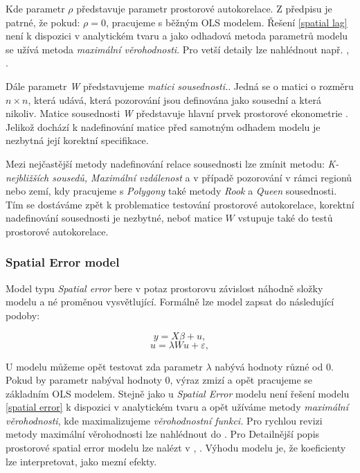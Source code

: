 \documentclass[11pt, a4paper]{article}
\begin{document}
Kde parametr \textit{$\rho$} představuje parametr prostorové autokorelace. Z předpisu je patrné, že pokud: \textit{$\rho = 0$}, pracujeme s běžným OLS modelem. Řešení \ref{spatial lag} není k dispozici v analytickém tvaru a jako odhadová metoda parametrů modelu se užívá metoda \textit{maximální věrohodnosti}. Pro vetší detaily lze nahlédnout např. \cite{lesage2008introduction}, \cite{formanek2019spatial}.

Dále parametr \textit{W} představujeme \textit{matici sousednosti.}. Jedná se o matici o rozměru \textit{$n \times n$}, která udává, která pozorování jsou definována jako sousední a která nikoliv. Matice sousednosti \textit{W} představuje hlavní prvek prostorové ekonometrie \cite{lesage2008introduction}. Jelikož dochází k nadefinování matice před samotným odhadem modelu je nezbytná její korektní specifikace. 

Mezi nejčastější metody nadefinování relace sousednosti lze zmínit metodu: \textit{K-nejbližších sousedů, Maximální vzdálenost} a v případě pozorování v rámci regionů nebo zemí, kdy pracujeme s \textit{Polygony} také metody \textit{Rook} a \textit{Queen} sousednosti. Tím se dostáváme zpět k problematice testování prostorové autokorelace, korektní nadefinování sousednosti je nezbytné, neboť matice \textit{$W$} vstupuje také do testů prostorové autokorelace.


\subsubsection{Spatial Error model}
Model typu \textit{Spatial error} bere v potaz prostorovu závislost náhodně složky modelu a né proměnou vysvětlující. Formálně lze model zapsat do následující podoby:
  
  \begin{equation} \label{spatial error}
y = X\beta + u, 
\end{equation}
\begin{equation*}
u = \lambda W u + \varepsilon,
\end{equation*}

U modelu můžeme opět testovat zda parametr \textit{$\lambda$} nabývá hodnoty různé od $0$. Pokud by parametr nabýval hodnoty $0$, výraz zmizí a opět pracujeme se základním OLS modelem. Stejně jako u \textit{Spatial Error} modelu není řešení modelu \ref{spatial error} k dispozici v analytickém tvaru a opět užíváme metody \textit{maximální věrohodnosti}, kde maximalizujeme \textit{věrohodnostní funkci.} Pro rychlou revizi metody maximální věrohodnosti lze nahlédnout do \cite{wooldridge2016introductory-citovat_kapitolu}. Pro Detailnější popis prostorové spatial error modelu lze nalézt v  \cite{james2013introduction}, \cite{formanek2019spatial}. Výhodu modelu je, že koeficienty lze interpretovat, jako mezní efekty.
\end{document}
